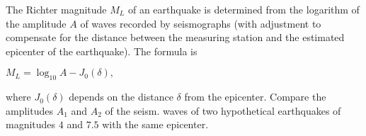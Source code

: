 \begin{frame}
\begin{example}
The Richter magnitude $M_L$ of an earthquake is determined from the logarithm of the amplitude $A$ of waves recorded by seismographs (with adjustment to compensate for the distance between the measuring station and the estimated epicenter of the earthquake). The formula is

\hfil \hfil$
M_L=\log_{10}A -J_0(\delta),
$

\noindent where $J_0(\delta)$ depends on the distance $\delta$ from the epicenter. Compare the amplitudes $A_1$ and $A_2$ of the seism. waves of two hypothetical earthquakes of magnitudes $4$ and $7.5$ with the same epicenter.

\end{example}
\end{frame}
